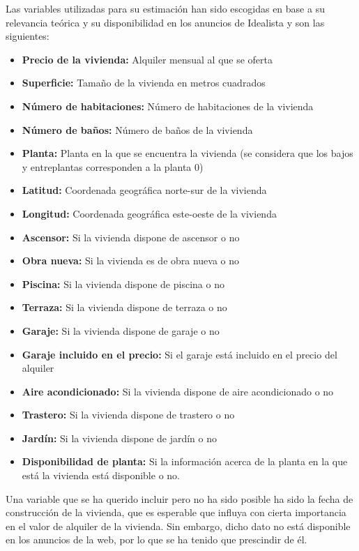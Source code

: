 \documentclass[11pt]{book}
\theoremstyle{plain} %
\theoremstyle{definition} %
\begin{document}
Las variables utilizadas para su estimación han sido escogidas en base
a su relevancia teórica y su disponibilidad en los anuncios de Idealista y 
son las siguientes: 
\begin{itemize}
   \item \textbf{Precio de la vivienda:} Alquiler mensual al que se oferta
   \item \textbf{Superficie:} Tamaño de la vivienda en metros cuadrados
   \item \textbf{Número de habitaciones:} Número de habitaciones de la vivienda
   \item \textbf{Número de baños:} Número de baños de la vivienda
   \item \textbf{Planta:} Planta en la que se encuentra la vivienda (se considera que los bajos y entreplantas corresponden a la planta 0)
   \item \textbf{Latitud:} Coordenada geográfica norte-sur de la vivienda
   \item \textbf{Longitud:} Coordenada geográfica este-oeste de la vivienda
   \item \textbf{Ascensor:} Si la vivienda dispone de ascensor o no
   \item \textbf{Obra nueva:} Si la vivienda es de obra nueva o no
   \item \textbf{Piscina:} Si la vivienda dispone de piscina o no
   \item \textbf{Terraza:} Si la vivienda dispone de terraza o no
   \item \textbf{Garaje:} Si la vivienda dispone de garaje o no
   \item \textbf{Garaje incluido en el precio:} Si el garaje está incluido 
   en el precio del alquiler
   \item \textbf{Aire acondicionado:} Si la vivienda dispone de aire acondicionado o no
   \item \textbf{Trastero:} Si la vivienda dispone de trastero o no
   \item \textbf{Jardín:} Si la vivienda dispone de jardín o no
   \item  \textbf{Disponibilidad de planta:} Si la información acerca de la 
   planta en la que está la vivienda está disponible o no.
\end{itemize}

Una variable que se ha querido incluir pero no ha sido posible ha sido la 
fecha de construcción de la vivienda, que es esperable que influya con 
cierta importancia en el valor de alquiler de la vivienda. Sin embargo, 
dicho dato no está disponible en los anuncios de la web, por lo que se ha 
tenido que prescindir de él. \\
\end{document}
